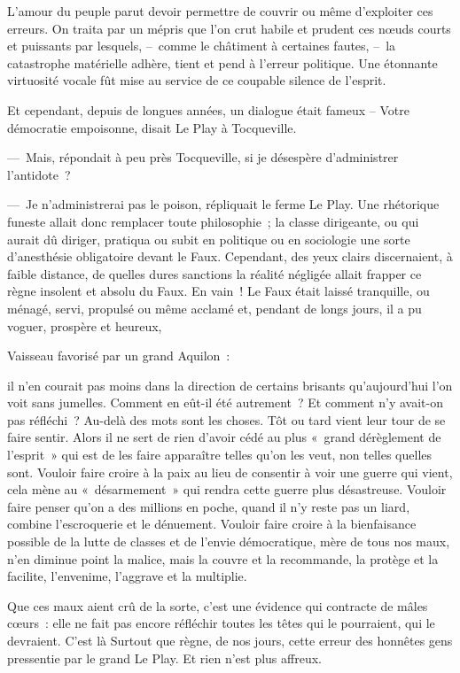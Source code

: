 \documentclass[french,twoside]{book} %
\begin{document}
L’amour du peuple parut devoir permettre de couvrir ou même d’exploiter ces erreurs. On traita par un mépris que l’on crut habile et prudent ces nœuds courts et puissants par lesquels, – comme le châtiment à certaines fautes, – la catastrophe matérielle adhère, tient et pend à l’erreur politique. Une étonnante virtuosité vocale fût mise au service de ce coupable silence de l’esprit.\par
Et cependant, depuis de longues années, un dialogue était fameux – Votre démocratie empoisonne, disait Le Play à Tocqueville.\par
— Mais, répondait à peu près Tocqueville, si je désespère d’administrer l’antidote ?\par
— Je n’administrerai pas le poison, répliquait le ferme Le Play. Une rhétorique funeste allait donc remplacer toute philosophie ; la classe dirigeante, ou qui aurait dû diriger, pratiqua ou subit en politique ou en sociologie une sorte d’anesthésie obligatoire devant le Faux. Cependant, des yeux clairs discernaient, à faible distance, de quelles dures sanctions la réalité négligée allait frapper ce règne insolent et absolu du Faux. En vain ! Le Faux était laissé tranquille, ou ménagé, servi, propulsé ou même acclamé et, pendant de longs jours, il a pu voguer, prospère et heureux,\par
Vaisseau favorisé par un grand Aquilon :\par
il n’en courait pas moins dans la direction de certains brisants qu’aujourd’hui l’on voit sans jumelles. Comment en eût-il été autrement ? Et comment n’y avait-on pas réfléchi ? Au-delà des mots sont les choses. Tôt ou tard vient leur tour de se faire sentir. Alors il ne sert de rien d’avoir cédé au plus « grand dérèglement de l’esprit » qui est de les faire apparaître telles qu’on les veut, non telles quelles sont. Vouloir faire croire à la paix au lieu de consentir à voir une guerre qui vient, cela mène au « désarmement » qui rendra cette guerre plus désastreuse. Vouloir faire penser qu’on a des millions en poche, quand il n’y reste pas un liard, combine l’escroquerie et le dénuement. Vouloir faire croire à la bienfaisance possible de la lutte de classes et de l’envie démocratique, mère de tous nos maux, n’en diminue point la malice, mais la couvre et la recommande, la protège et la facilite, l’envenime, l’aggrave et la multiplie.\par
Que ces maux aient crû de la sorte, c’est une évidence qui contracte de mâles cœurs : elle ne fait pas encore réfléchir toutes les têtes qui le pourraient, qui le devraient. C’est là Surtout que règne, de nos jours, cette erreur des honnêtes gens pressentie par le grand Le Play. Et rien n’est plus affreux.\par
\end{document}
